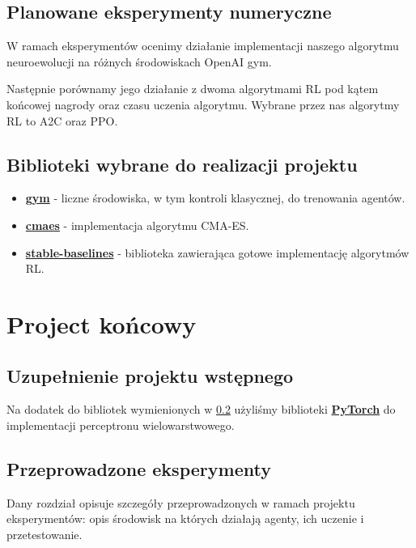 \documentclass[12pt,a4paper]{article}
\begin{document}
\subsection{Planowane eksperymenty numeryczne}\label{subsection:planned}

W ramach eksperymentów ocenimy działanie implementacji naszego algorytmu
neuroewolucji na różnych środowiskach OpenAI gym.

Następnie porównamy jego działanie z dwoma algorytmami RL pod kątem
końcowej nagrody oraz czasu uczenia algorytmu. Wybrane przez nas
algorytmy RL to A2C oraz PPO.


\subsection{Biblioteki wybrane do realizacji projektu}\label{subsection:libs}

\begin{itemize}
  \item \textbf{\href{https://github.com/openai/gym}{gym}} - liczne środowiska, w tym kontroli klasycznej,
        do trenowania agentów.
  \item \textbf{\href{https://github.com/CyberAgentAILab/cmaes}{cmaes}} -
        implementacja algorytmu CMA-ES.
  \item \textbf{\href{https://github.com/DLR-RM/stable-baselines3}{stable-baselines}} -
        biblioteka zawierająca gotowe implementację algorytmów RL.
\end{itemize}

\pagebreak
\section{Project końcowy}

\subsection{Uzupełnienie projektu wstępnego}

Na dodatek do bibliotek wymienionych w \ref{subsection:libs} użyliśmy
biblioteki \textbf{\href{https://pytorch.org/}{PyTorch}} do implementacji
perceptronu wielowarstwowego.

\subsection{Przeprowadzone eksperymenty}

Dany rozdział opisuje szczegóły przeprowadzonych w ramach projektu
eksperymentów: opis środowisk na których działają agenty, ich uczenie i
przetestowanie.
\end{document}
